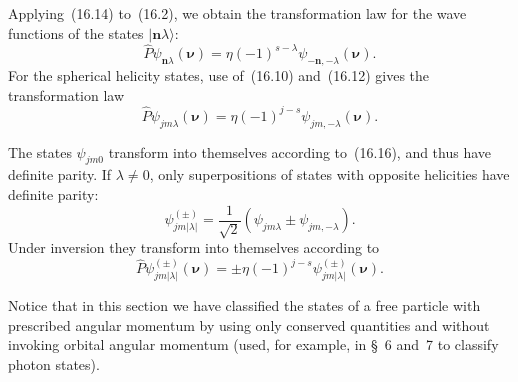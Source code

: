 Applying~(16.14) to~(16.2), we obtain the transformation law for the wave functions of the states $|\mathbf n\lambda\rangle$:
\begin{equation}
\widehat P\psi_{\mathbf n\lambda}(\boldsymbol\nu)
=\eta(-1)^{s-\lambda}\psi_{-\mathbf n,-\lambda}(\boldsymbol\nu).
\tag{16.15}
\end{equation}
For the spherical helicity states, use of~(16.10) and~(16.12) gives the transformation law
\begin{equation}
\widehat P\psi_{jm\lambda}(\boldsymbol\nu)
=\eta(-1)^{j-s}\psi_{jm,-\lambda}(\boldsymbol\nu).
\tag{16.16}
\end{equation}

The states $\psi_{jm0}$ transform into themselves according to~(16.16), and thus have definite parity. If $\lambda\ne0$, only superpositions of states with opposite helicities have definite parity:
\begin{equation}
\psi^{(\pm)}_{jm|\lambda|}
=\frac{1}{\sqrt2}\left(\psi_{jm\lambda}\pm\psi_{jm,-\lambda}\right).
\tag{16.17}
\end{equation}
Under inversion they transform into themselves according to
\begin{equation}
\widehat P\psi^{(\pm)}_{jm|\lambda|}(\boldsymbol\nu)
=\pm\eta(-1)^{j-s}\psi^{(\pm)}_{jm|\lambda|}(\boldsymbol\nu).
\tag{16.18}
\end{equation}

Notice that in this section we have classified the states of a free particle with prescribed angular momentum by using only conserved quantities and without invoking orbital angular momentum (used, for example, in \S~6 and~7 to classify photon states).

